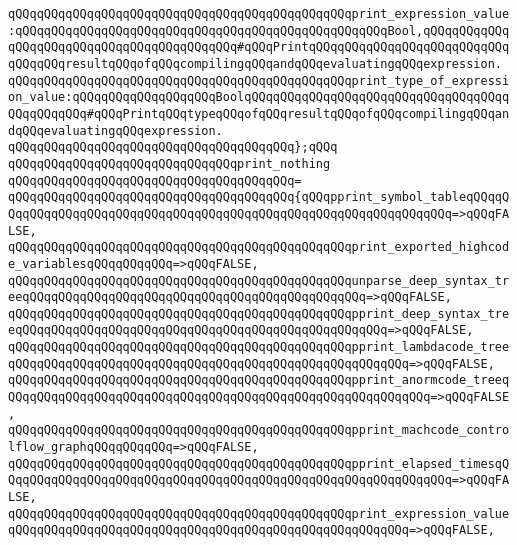 \verb|qQQqqQQqqQQqqQQqqQQqqQQqqQQqqQQqqQQqqQQqqQQqqQQqprint_expression_value:qQQqqQQqqQQqqQQqqQQqqQQqqQQqqQQqqQQqqQQqqQQqqQQqqQQqBool,qQQqqQQqqQQqqQQqqQQqqQQqqQQqqQQqqQQqqQQqqQQq#qQQqPrintqQQqqQQqqQQqqQQqqQQqqQQqqQQqqQQqqQQqresultqQQqofqQQqcompilingqQQqandqQQqevaluatingqQQqexpression.|\newline
\verb|qQQqqQQqqQQqqQQqqQQqqQQqqQQqqQQqqQQqqQQqqQQqqQQqprint_type_of_expression_value:qQQqqQQqqQQqqQQqqQQqBoolqQQqqQQqqQQqqQQqqQQqqQQqqQQqqQQqqQQqqQQqqQQqqQQq#qQQqPrintqQQqtypeqQQqofqQQqresultqQQqofqQQqcompilingqQQqandqQQqevaluatingqQQqexpression.|\newline
\verb|qQQqqQQqqQQqqQQqqQQqqQQqqQQqqQQqqQQqqQQq};qQQq|\newline
\newline
\verb|qQQqqQQqqQQqqQQqqQQqqQQqqQQqqQQqprint_nothing|\newline
\verb|qQQqqQQqqQQqqQQqqQQqqQQqqQQqqQQqqQQqqQQq=|\newline
\verb|qQQqqQQqqQQqqQQqqQQqqQQqqQQqqQQqqQQqqQQq{qQQqpprint_symbol_tableqQQqqQQqqQQqqQQqqQQqqQQqqQQqqQQqqQQqqQQqqQQqqQQqqQQqqQQqqQQqqQQqqQQq=>qQQqFALSE,|\newline
\verb|qQQqqQQqqQQqqQQqqQQqqQQqqQQqqQQqqQQqqQQqqQQqqQQqprint_exported_highcode_variablesqQQqqQQqqQQq=>qQQqFALSE,|\newline
\verb|qQQqqQQqqQQqqQQqqQQqqQQqqQQqqQQqqQQqqQQqqQQqqQQqunparse_deep_syntax_treeqQQqqQQqqQQqqQQqqQQqqQQqqQQqqQQqqQQqqQQqqQQqqQQq=>qQQqFALSE,|\newline
\verb|qQQqqQQqqQQqqQQqqQQqqQQqqQQqqQQqqQQqqQQqqQQqqQQqpprint_deep_syntax_treeqQQqqQQqqQQqqQQqqQQqqQQqqQQqqQQqqQQqqQQqqQQqqQQqqQQq=>qQQqFALSE,|\newline
\verb|qQQqqQQqqQQqqQQqqQQqqQQqqQQqqQQqqQQqqQQqqQQqqQQqpprint_lambdacode_treeqQQqqQQqqQQqqQQqqQQqqQQqqQQqqQQqqQQqqQQqqQQqqQQqqQQqqQQq=>qQQqFALSE,|\newline
\verb|qQQqqQQqqQQqqQQqqQQqqQQqqQQqqQQqqQQqqQQqqQQqqQQqpprint_anormcode_treeqQQqqQQqqQQqqQQqqQQqqQQqqQQqqQQqqQQqqQQqqQQqqQQqqQQqqQQqqQQq=>qQQqFALSE,|\newline
\verb|qQQqqQQqqQQqqQQqqQQqqQQqqQQqqQQqqQQqqQQqqQQqqQQqpprint_machcode_controlflow_graphqQQqqQQqqQQq=>qQQqFALSE,|\newline
\verb|qQQqqQQqqQQqqQQqqQQqqQQqqQQqqQQqqQQqqQQqqQQqqQQqpprint_elapsed_timesqQQqqQQqqQQqqQQqqQQqqQQqqQQqqQQqqQQqqQQqqQQqqQQqqQQqqQQqqQQqqQQq=>qQQqFALSE,|\newline
\verb|qQQqqQQqqQQqqQQqqQQqqQQqqQQqqQQqqQQqqQQqqQQqqQQqprint_expression_valueqQQqqQQqqQQqqQQqqQQqqQQqqQQqqQQqqQQqqQQqqQQqqQQqqQQqqQQq=>qQQqFALSE,|\newline
